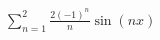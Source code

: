\documentclass[preview]{standalone}
\begin{document}
\begin{center}
$\sum_{n=1}^{2} \frac{2(-1)^n}{n} \sin(nx)$
\end{center}
\end{document}
